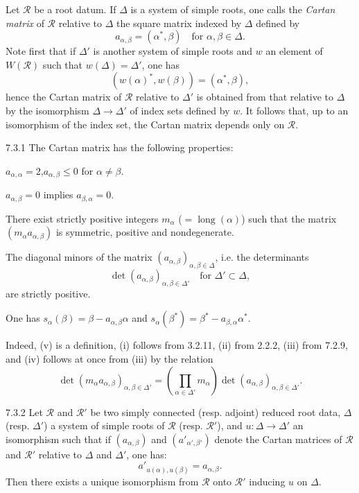 Let $\mathcal R$ be a root datum. If $\Delta$ is a system of simple roots, one calls the \emph{Cartan matrix} of $\mathcal R$ relative to $\Delta$ the square matrix indexed by $\Delta$ defined by
\[
a_{\alpha,\beta}=(\alpha^*,\beta)\quad\text{for }\alpha,\beta\in\Delta.
\]
Note first that if $\Delta'$ is another system of simple roots and $w$ an element of $W(\mathcal R)$ such that $w(\Delta)=\Delta'$, one has
\[
(w(\alpha)^*,w(\beta))=(\alpha^*,\beta),
\]
hence the Cartan matrix of $\mathcal R$ relative to $\Delta'$ is obtained from that relative to $\Delta$ by the isomorphism $\Delta\to\Delta'$ of index sets defined by $w$. It follows that, up to an isomorphism of the index set, the Cartan matrix depends only on $\mathcal R$.
\begin{proposition}{7.3.1}\label{XXI.7.3.1}
The Cartan matrix has the following properties:
\begin{enumeratei}
\item $a_{\alpha,\alpha}=2$,\qquad$a_{\alpha,\beta}\leq0$ for $\alpha\ne\beta$.
\item $a_{\alpha,\beta}=0$ implies $a_{\beta,\alpha}=0$.
\item There exist strictly positive integers $m_\alpha$ ($=\operatorname{long}(\alpha)$) such that the matrix $(m_\alpha a_{\alpha,\beta})$ is symmetric, positive and nondegenerate.
\item The diagonal minors of the matrix $(a_{\alpha,\beta})_{\alpha,\beta\in\Delta}$, i.e. the determinants
\[
\det(a_{\alpha,\beta})_{\alpha,\beta\in\Delta'}\quad\text{for }\Delta'\subset\Delta,
\]
are strictly positive.
\item One has $s_\alpha(\beta)=\beta-a_{\alpha,\beta}\alpha$ and $s_\alpha(\beta^*)=\beta^*-a_{\beta,\alpha}\alpha^*$.
\end{enumeratei}
\end{proposition}
Indeed, (v) is a definition, (i) follows from 3.2.11, (ii) from 2.2.2, (iii) from 7.2.9, and (iv) follows at once from (iii) by the relation
\[
\det(m_\alpha a_{\alpha,\beta})_{\alpha,\beta\in\Delta'}=
\left(\prod_{\alpha\in\Delta'}m_\alpha\right)\det(a_{\alpha,\beta})_{\alpha,\beta\in\Delta'}.
\]
\begin{proposition}{7.3.2}\label{XXI.7.3.2}
Let $\mathcal R$ and $\mathcal R'$ be two simply connected (resp. adjoint) reduced root data, $\Delta$ (resp. $\Delta'$) a system of simple roots of $\mathcal R$ (resp. $\mathcal R'$), and $u:\Delta\to\Delta'$ an isomorphism such that if $(a_{\alpha,\beta})$ and $(a'_{\alpha',\beta'})$ denote the Cartan matrices of $\mathcal R$ and $\mathcal R'$ relative to $\Delta$ and $\Delta'$, one has:
\[
a'_{u(\alpha),u(\beta)}=a_{\alpha,\beta}.
\]
Then there exists a unique isomorphism from $\mathcal R$ onto $\mathcal R'$ inducing $u$ on $\Delta$.
\end{proposition}
